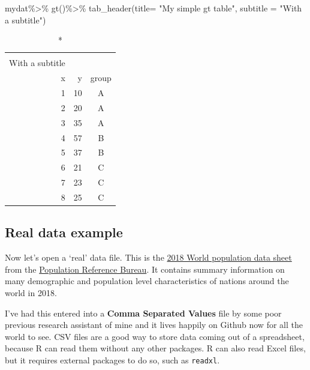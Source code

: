 \documentclass[
]{article}
\newenvironment{Shaded}{\begin{snugshade}}{\end{snugshade}}
\newcommand{\AttributeTok}[1]{\textcolor[rgb]{0.77,0.63,0.00}{#1}}
\newcommand{\FunctionTok}[1]{\textcolor[rgb]{0.00,0.00,0.00}{#1}}
\newcommand{\NormalTok}[1]{#1}
\newcommand{\SpecialCharTok}[1]{\textcolor[rgb]{0.00,0.00,0.00}{#1}}
\newcommand{\StringTok}[1]{\textcolor[rgb]{0.31,0.60,0.02}{#1}}
\begin{document}
\begin{Shaded}
\begin{Highlighting}[]
\NormalTok{mydat}\SpecialCharTok{\%\textgreater{}\%}
  \FunctionTok{gt}\NormalTok{()}\SpecialCharTok{\%\textgreater{}\%}
  \FunctionTok{tab\_header}\NormalTok{(}\AttributeTok{title=} \StringTok{"My simple gt table"}\NormalTok{,}
             \AttributeTok{subtitle =} \StringTok{"With a subtitle"}\NormalTok{)}
\end{Highlighting}
\end{Shaded}

\captionsetup[table]{labelformat=empty,skip=1pt}
\begin{longtable}{rrc}
\caption*{
{\large My simple gt table} \\ 
{\small With a subtitle}
} \\ 
\toprule
x & y & group \\ 
\midrule
1 & 10 & A \\ 
2 & 20 & A \\ 
3 & 35 & A \\ 
4 & 57 & B \\ 
5 & 37 & B \\ 
6 & 21 & C \\ 
7 & 23 & C \\ 
8 & 25 & C \\ 
 \bottomrule
\end{longtable}

\hypertarget{real-data-example}{%
\subsection{Real data example}\label{real-data-example}}

Now let's open a `real' data file. This is the \href{https://www.prb.org/2018-world-population-data-sheet-with-focus-on-changing-age-structures/}{2018 World population
data
sheet}
from the \href{http://www.prb.org}{Population Reference Bureau}. It contains
summary information on many demographic and population level
characteristics of nations around the world in 2018.

I've had this entered into a \textbf{Comma Separated Values} file by some
poor previous research assistant of mine and it lives happily on Github
now for all the world to see. CSV files are a good way to store data
coming out of a spreadsheet, because R can read them without any other
packages. R can also read Excel files, but it requires external packages
to do so, such as \texttt{readxl}.
\end{document}
